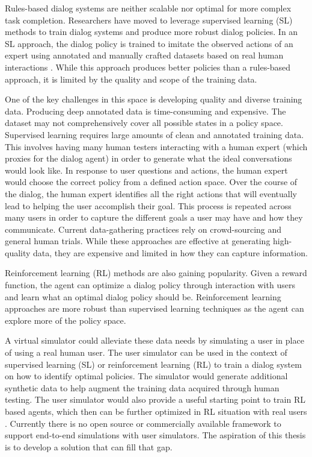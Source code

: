 Rules-based dialog systems are neither scalable nor optimal for more complex task completion. Researchers have moved to leverage supervised learning (SL) methods to train dialog systems and produce more robust dialog policies. In an SL approach, the dialog policy is trained to imitate the observed actions of an expert using annotated and manually crafted datasets based on real human interactions \cite{Schatzmann2006ASO}. While this approach produces better policies than a rules-based approach, it is limited by the quality and scope of the training data. 

One of the key challenges in this space is developing quality and diverse training data. Producing deep annotated data is time-consuming and expensive. The dataset may not comprehensively cover all possible states in a policy space. Supervised learning requires large amounts of clean and annotated training data. This involves having many human testers interacting with a human expert (which proxies for the dialog agent) in order to generate what the ideal conversations would look like. In response to user questions and actions, the human expert would choose the correct policy from a defined action space. Over the course of the dialog, the human expert identifies all the right actions that will eventually lead to helping the user accomplish their goal. This process is repeated across many users in order to capture the different goals a user may have and how they communicate. Current data-gathering practices rely on crowd-sourcing and general human trials. While these approaches are effective at generating high-quality data, they are expensive and limited in how they can capture information.  

Reinforcement learning (RL) methods are also gaining popularity. Given a reward function, the agent can optimize a dialog policy through interaction with users and learn what an optimal dialog policy should be. Reinforcement learning approaches are more robust than supervised learning techniques as the agent can explore more of the policy space.

A virtual simulator could alleviate these data needs by simulating a user in place of using a real human user. The user simulator can be used in the context of supervised learning (SL) or reinforcement learning (RL) to train a dialog system on how to identify optimal policies. The simulator would generate additional synthetic data to help augment the training data acquired through human testing. The user simulator would also provide a useful starting point to train RL based agents, which then can be further optimized in RL situation with real users \cite{li_usersim}. Currently there is no open source or commercially available framework to support end-to-end simulations with user simulators. The aspiration of this thesis is to develop a solution that can fill that gap. 

